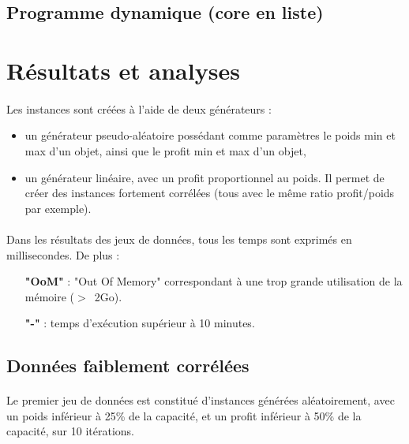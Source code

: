 \documentclass[12pt]{article}
\begin{document}
\subsection{Programme dynamique (core en liste)}

\paragraph{}

\section{Résultats et analyses}

\paragraph{}Les instances sont créées à l'aide de deux générateurs :
\begin{itemize}
\item un générateur pseudo-aléatoire possédant comme paramètres le poids min et max d'un objet, ainsi que le profit min et max d'un objet,
\item un générateur linéaire, avec un profit proportionnel au poids. Il permet de créer des instances fortement corrélées (tous avec le même ratio profit/poids par exemple).
\end{itemize}

\paragraph{}Dans les résultats des jeux de données, tous les temps sont exprimés en millisecondes. De plus :
\begin{itemize}
 \item[\textbf{"OoM"}] : "Out Of Memory" correspondant à une trop grande utilisation de la mémoire ($>$~2Go).
 \item[\textbf{"-"}] : temps d'exécution supérieur à 10 minutes.
 \end{itemize}

\subsection{Données faiblement corrélées}

\paragraph{}Le premier jeu de données est constitué d'instances générées aléatoirement, avec un poids inférieur à 25\% de la capacité, et un profit inférieur à 50\% de la capacité, sur 10 itérations.
\end{document}
